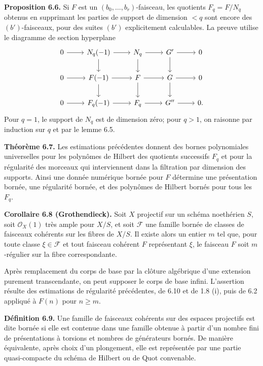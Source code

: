 \documentclass[11pt]{article}
\begin{document}
\textbf{Proposition 6.6.} Si $F$ est un $(b_0,\ldots,b_r)$-faisceau, les quotients $F_q=F/N_q$ obtenus en supprimant les parties de support de dimension $<q$ sont encore des $(b')$-faisceaux, pour des suites $(b')$ explicitement calculables. La preuve utilise le diagramme de section hyperplane
\[
\begin{tikzcd}
0 \arrow[r] & N_q(-1) \arrow[r] \arrow[d] & N_q \arrow[r] \arrow[d] & G' \arrow[r] \arrow[d] & 0 \\
0 \arrow[r] & F(-1) \arrow[r] \arrow[d] & F \arrow[r] \arrow[d] & G \arrow[r] \arrow[d] & 0 \\
0 \arrow[r] & F_q(-1) \arrow[r] & F_q \arrow[r] & G'' \arrow[r] & 0 .
\end{tikzcd}
\]
Pour $q=1$, le support de $N_q$ est de dimension z\'ero; pour $q>1$, on raisonne par induction sur $q$ et par le lemme 6.5.

\textbf{Th\'eor\`eme 6.7.} Les estimations pr\'ec\'edentes donnent des bornes polynomiales universelles pour les polyn\^omes de Hilbert des quotients successifs $F_q$ et pour la r\'egularit\'e des morceaux qui interviennent dans la filtration par dimension des supports. Ainsi une donn\'ee num\'erique born\'ee pour $F$ d\'etermine une pr\'esentation born\'ee, une r\'egularit\'e born\'ee, et des polyn\^omes de Hilbert born\'es pour tous les $F_q$.

\textbf{Corollaire 6.8 (Grothendieck).} Soit $X$ projectif sur un sch\'ema noeth\'erien $S$, soit $\mathcal O_X(1)$ tr\`es ample pour $X/S$, et soit $\mathcal F$ une famille born\'ee de classes de faisceaux coh\'erents sur les fibres de $X/S$. Il existe alors un entier $m$ tel que, pour toute classe $\xi\in\mathcal F$ et tout faisceau coh\'erent $F$ repr\'esentant $\xi$, le faisceau $F$ soit $m$-r\'egulier sur la fibre correspondante.

Apr\`es remplacement du corps de base par la cl\^oture alg\'ebrique d'une extension purement transcendante, on peut supposer le corps de base infini. L'assertion r\'esulte des estimations de r\'egularit\'e pr\'ec\'edentes, de 6.10 et de 1.8 (i), puis de 6.2 appliqu\'e \`a $F(n)$ pour $n\ge m$.

\textbf{D\'efinition 6.9.} Une famille de faisceaux coh\'erents sur des espaces projectifs est dite born\'ee si elle est contenue dans une famille obtenue \`a partir d'un nombre fini de pr\'esentations \`a torsions et nombres de g\'en\'erateurs born\'es. De mani\`ere \'equivalente, apr\`es choix d'un plongement, elle est repr\'esent\'ee par une partie quasi-compacte du sch\'ema de Hilbert ou de Quot convenable.
\end{document}
